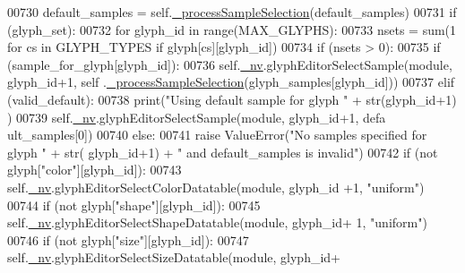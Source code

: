 \begin{DoxyCode}
00730         default\_samples = self.\hyperlink{classnavicom_1_1navicom_1_1NaviCom_a2acd087f6c61dc8c7e1bc5a3391ff982}{_processSampleSelection}(default\_samples)
00731         \textcolor{keywordflow}{if} (glyph\_set):
00732             \textcolor{keywordflow}{for} glyph\_id \textcolor{keywordflow}{in} range(MAX\_GLYPHS):
00733                 nsets = sum(1 \textcolor{keywordflow}{for} cs \textcolor{keywordflow}{in} GLYPH\_TYPES \textcolor{keywordflow}{if} glyph[cs][glyph\_id])
00734                 \textcolor{keywordflow}{if} (nsets > 0):
00735                     \textcolor{keywordflow}{if} (sample\_for\_glyph[glyph\_id]):
00736                         self.\hyperlink{classnavicom_1_1navicom_1_1NaviCom_afff3fd56fa16a68bab52ba8d801e325a}{_nv}.glyphEditorSelectSample(module, glyph\_id+1, self
      .\hyperlink{classnavicom_1_1navicom_1_1NaviCom_a2acd087f6c61dc8c7e1bc5a3391ff982}{_processSampleSelection}(glyph\_samples[glyph\_id]))
00737                     \textcolor{keywordflow}{elif} (valid\_default):
00738                         \textcolor{keywordflow}{print}(\textcolor{stringliteral}{"Using default sample for glyph "} + str(glyph\_id+1)
      )
00739                         self.\hyperlink{classnavicom_1_1navicom_1_1NaviCom_afff3fd56fa16a68bab52ba8d801e325a}{_nv}.glyphEditorSelectSample(module, glyph\_id+1, defa
      ult\_samples[0])
00740                     \textcolor{keywordflow}{else}:
00741                         \textcolor{keywordflow}{raise} ValueError(\textcolor{stringliteral}{"No samples specified for glyph "} + str(
      glyph\_id+1) + \textcolor{stringliteral}{" and default\_samples is invalid"})
00742                     \textcolor{keywordflow}{if} (\textcolor{keywordflow}{not} glyph[\textcolor{stringliteral}{"color"}][glyph\_id]):
00743                         self.\hyperlink{classnavicom_1_1navicom_1_1NaviCom_afff3fd56fa16a68bab52ba8d801e325a}{_nv}.glyphEditorSelectColorDatatable(module, glyph\_id
      +1, \textcolor{stringliteral}{"uniform"})
00744                     \textcolor{keywordflow}{if} (\textcolor{keywordflow}{not} glyph[\textcolor{stringliteral}{"shape"}][glyph\_id]):
00745                        self.\hyperlink{classnavicom_1_1navicom_1_1NaviCom_afff3fd56fa16a68bab52ba8d801e325a}{_nv}.glyphEditorSelectShapeDatatable(module, glyph\_id+
      1, \textcolor{stringliteral}{"uniform"})
00746                     \textcolor{keywordflow}{if} (\textcolor{keywordflow}{not} glyph[\textcolor{stringliteral}{"size"}][glyph\_id]):
00747                         self.\hyperlink{classnavicom_1_1navicom_1_1NaviCom_afff3fd56fa16a68bab52ba8d801e325a}{_nv}.glyphEditorSelectSizeDatatable(module, glyph\_id+

\end{DoxyCode}
